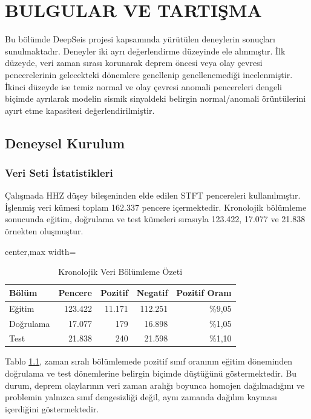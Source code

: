 \chapter{BULGULAR VE TARTIŞMA}

Bu bölümde DeepSeis projesi kapsamında yürütülen deneylerin sonuçları sunulmaktadır. Deneyler iki ayrı değerlendirme düzeyinde ele alınmıştır. İlk düzeyde, veri zaman sırası korunarak deprem öncesi veya olay çevresi pencerelerinin gelecekteki dönemlere genellenip genellenemediği incelenmiştir. İkinci düzeyde ise temiz normal ve olay çevresi anomali pencereleri dengeli biçimde ayrılarak modelin sismik sinyaldeki belirgin normal/anomali örüntülerini ayırt etme kapasitesi değerlendirilmiştir.

\section{Deneysel Kurulum}

\subsection{Veri Seti İstatistikleri}

Çalışmada HHZ düşey bileşeninden elde edilen STFT pencereleri kullanılmıştır. İşlenmiş veri kümesi toplam 162.337 pencere içermektedir. Kronolojik bölümleme sonucunda eğitim, doğrulama ve test kümeleri sırasıyla 123.422, 17.077 ve 21.838 örnekten oluşmuştur.

\begin{table}[htbp]
\centering
\small
\caption{Kronolojik Veri Bölümleme Özeti}
\begin{adjustbox}{center,max width=\textwidth}
\begin{tabular}{lrrrr}
\toprule
\textbf{Bölüm} & \textbf{Pencere} & \textbf{Pozitif} & \textbf{Negatif} & \textbf{Pozitif Oranı} \\
\midrule
Eğitim & 123.422 & 11.171 & 112.251 & \%9,05 \\
Doğrulama & 17.077 & 179 & 16.898 & \%1,05 \\
Test & 21.838 & 240 & 21.598 & \%1,10 \\
\bottomrule
\end{tabular}
\end{adjustbox}
\label{tab:kronolojik_bolumleme}
\end{table}

Tablo \ref{tab:kronolojik_bolumleme}, zaman sıralı bölümlemede pozitif sınıf oranının eğitim döneminden doğrulama ve test dönemlerine belirgin biçimde düştüğünü göstermektedir. Bu durum, deprem olaylarının veri zaman aralığı boyunca homojen dağılmadığını ve problemin yalnızca sınıf dengesizliği değil, aynı zamanda dağılım kayması içerdiğini göstermektedir.

